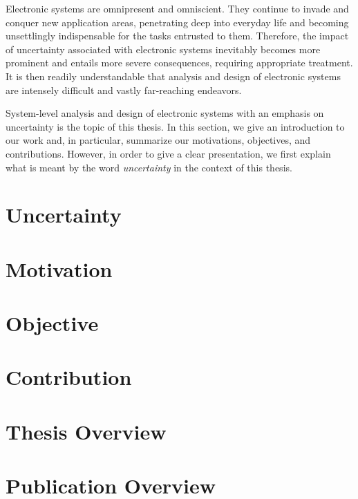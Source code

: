 Electronic systems are omnipresent and omniscient. They continue to invade and
conquer new application areas, penetrating deep into everyday life and becoming
unsettlingly indispensable for the tasks entrusted to them. Therefore, the
impact of uncertainty associated with electronic systems inevitably becomes more
prominent and entails more severe consequences, requiring appropriate treatment.
It is then readily understandable that analysis and design of electronic systems
are intensely difficult and vastly far-reaching endeavors.

System-level analysis and design of electronic systems with an emphasis on
uncertainty is the topic of this thesis. In this section, we give an
introduction to our work and, in particular, summarize our motivations,
objectives, and contributions. However, in order to give a clear presentation,
we first explain what is meant by the word \emph{uncertainty} in the context of
this thesis.

\section{Uncertainty}

\section{Motivation}

\section{Objective}

\section{Contribution}

\section{\pasttitle}

\section{Thesis Overview}

\section{Publication Overview}
